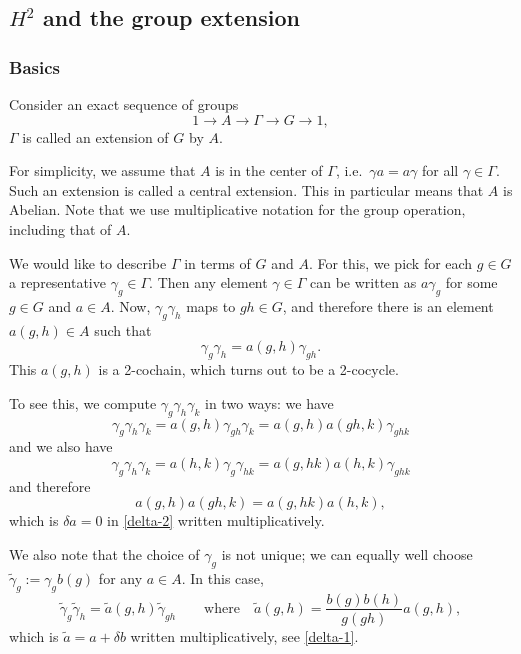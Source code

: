 \documentclass[12pt]{article}
\numberwithin{equation}{section}
\numberwithin{figure}{section}
\theoremstyle{remark}
\begin{document}
\subsection{$H^2$ and the group extension}

\subsubsection{Basics}
Consider an exact sequence of groups \begin{equation}
1\to A\to \Gamma \to G\to 1,
\label{central-ext}
\end{equation} 
$\Gamma$ is called an extension of $G$ by $A$.

For simplicity, we assume that $A$ is in the center of $\Gamma$,
i.e.~$\gamma a = a\gamma$ for all $\gamma \in \Gamma$.
Such an extension is called a central extension.
This in particular means that $A$ is Abelian.
Note that we use multiplicative notation for the group operation,
including that of $A$.

We would like to describe $\Gamma$ in terms of $G$ and $A$.
For this, we pick for each $g\in G$ a representative $\gamma_g\in \Gamma$.
Then any element $\gamma\in \Gamma$ can be written 
as $a \gamma_g $ for some $g\in G$ and $a\in A$.
Now, $\gamma_g \gamma_h$ maps to $gh\in G$,
and therefore there is an element $a(g,h)\in A$
such that \begin{equation}
\gamma_g \gamma_h = a(g,h) \gamma_{gh}.
\end{equation}
This $a(g,h)$ is a 2-cochain, which turns out to be a 2-cocycle.

To see this, we compute $\gamma_g \gamma_h \gamma_k$ in two ways:
we have
\begin{equation}
\gamma_g \gamma_h \gamma_k = a(g,h) \gamma_{gh} \gamma_k = a(g,h) a(gh,k) \gamma_{ghk}
\end{equation} and we also have
\begin{equation}
\gamma_g\gamma_h \gamma_k = a(h,k) \gamma_{g} \gamma_{hk} = a(g,hk) a(h,k) \gamma_{ghk}
\end{equation} and therefore \begin{equation}
a(g,h) a(gh,k) = a(g,hk) a(h,k),
\end{equation}
which is $\delta a=0$ in \eqref{delta-2} written multiplicatively.

We also note that the choice of $\gamma_g$ is not unique;
we can equally well choose $\tilde\gamma_g:=\gamma_g b(g)$ for any $a\in A$.
In this case, \begin{equation}
\tilde \gamma_g \tilde \gamma_h = \tilde a(g,h) \tilde\gamma_{gh} 
\qquad\text{where}\quad \tilde a(g,h)=\frac{b(g) b(h)}{g(gh)} a(g,h),
\end{equation}
which is $\tilde a=a + \delta b$ written multiplicatively, see \eqref{delta-1}.
\end{document}
